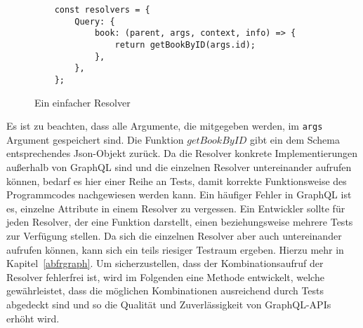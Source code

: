\begin{figure}[htb]
    \begin{verbatim}
    const resolvers = {
        Query: {
            book: (parent, args, context, info) => {
                return getBookByID(args.id);
            },
        },
    };
    \end{verbatim}
    \caption{Ein einfacher Resolver}
    \label{simpleresolver}
\end{figure}

Es ist zu beachten, dass alle Argumente, die mitgegeben werden, im \verb+args+ Argument gespeichert sind.
Die Funktion $getBookByID$ gibt ein dem Schema entsprechendes Json-Objekt zurück.
Da die Resolver konkrete Implementierungen außerhalb von GraphQL sind und die einzelnen Resolver untereinander aufrufen können, bedarf es hier
einer Reihe an Tests, damit korrekte Funktionsweise des Programmcodes nachgewiesen werden kann.
Ein häufiger Fehler in GraphQL ist es, einzelne Attribute in einem Resolver zu vergessen.
Ein Entwickler sollte für jeden Resolver, der eine Funktion darstellt, einen beziehungsweise mehrere Tests zur Verfügung stellen.
Da sich die einzelnen Resolver aber auch untereinander aufrufen können, kann sich ein teils riesiger Testraum ergeben.
Hierzu mehr in Kapitel~\ref{abfrgraph}.
Um sicherzustellen, dass der Kombinationsaufruf der Resolver fehlerfrei ist, wird im Folgenden eine Methode entwickelt, welche gewährleistet,
dass die möglichen Kombinationen ausreichend durch Tests abgedeckt sind und so die Qualität und Zuverlässigkeit von GraphQL-APIs erhöht wird.
